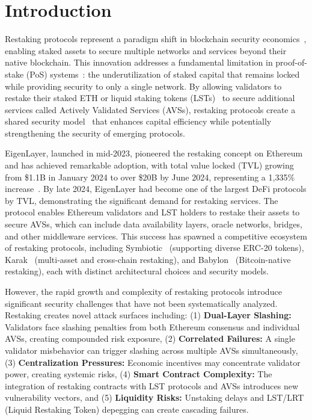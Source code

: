 \documentclass[runningheads]{llncs}
\begin{document}
\section{Introduction}

Restaking protocols represent a paradigm shift in blockchain security economics~\cite{eigenlayer2024,eigenlayerwhitepaper2023}, enabling staked assets to secure multiple networks and services beyond their native blockchain. This innovation addresses a fundamental limitation in proof-of-stake (PoS) systems~\cite{buterin2014ethereum,wood2014ethereum,buterin2017casper}: the underutilization of staked capital that remains locked while providing security to only a single network. By allowing validators to restake their staked ETH or liquid staking tokens (LSTs)~\cite{lido2024,rocketpool2024,coinbase2024cbeth} to secure additional services called Actively Validated Services (AVSs), restaking protocols create a shared security model~\cite{wood2021polkadot} that enhances capital efficiency while potentially strengthening the security of emerging protocols.

EigenLayer, launched in mid-2023, pioneered the restaking concept on Ethereum and has achieved remarkable adoption, with total value locked (TVL) growing from \$1.1B in January 2024 to over \$20B by June 2024, representing a 1,335\% increase~\cite{defillama2024}. By late 2024, EigenLayer had become one of the largest DeFi protocols by TVL, demonstrating the significant demand for restaking services. The protocol enables Ethereum validators and LST holders to restake their assets to secure AVSs, which can include data availability layers, oracle networks, bridges, and other middleware services. This success has spawned a competitive ecosystem of restaking protocols, including Symbiotic~\cite{symbiotic2024,symbioticwhitepaper2024} (supporting diverse ERC-20 tokens), Karak~\cite{karak2024} (multi-asset and cross-chain restaking), and Babylon~\cite{babylon2024} (Bitcoin-native restaking), each with distinct architectural choices and security models.

However, the rapid growth and complexity of restaking protocols introduce significant security challenges that have not been systematically analyzed. Restaking creates novel attack surfaces including: (1) \textbf{Dual-Layer Slashing:} Validators face slashing penalties from both Ethereum consensus and individual AVSs, creating compounded risk exposure, (2) \textbf{Correlated Failures:} A single validator misbehavior can trigger slashing across multiple AVSs simultaneously, (3) \textbf{Centralization Pressures:} Economic incentives may concentrate validator power, creating systemic risks, (4) \textbf{Smart Contract Complexity:} The integration of restaking contracts with LST protocols and AVSs introduces new vulnerability vectors, and (5) \textbf{Liquidity Risks:} Unstaking delays and LST/LRT (Liquid Restaking Token) depegging can create cascading failures.
\end{document}
